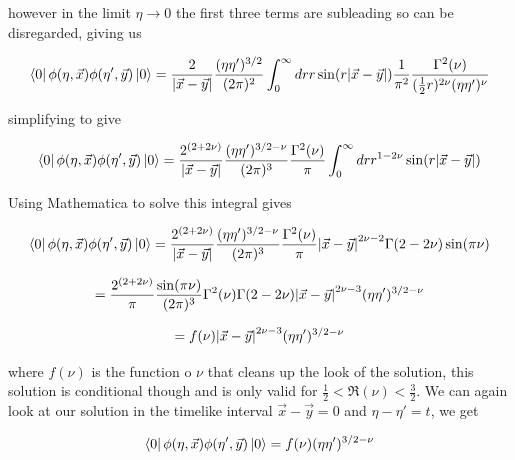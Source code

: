 \documentclass[a4paper,11pt]{article}
\numberwithin{equation}{section}
\numberwithin{figure}{section}
\begin{document}
\begin{large}
however in the limit $\eta\rightarrow0$ the first three terms are subleading so can be disregarded, giving us

\begin{equation}
\label{2pointsolr eta<<1}    
    \bra{0} \phi(\eta,\Vec{x})\phi(\eta',\Vec{y})\ket{0}=\frac{2}{\abs{\Vec{x}-\Vec{y}}}\frac{(\eta\eta')^{3/2}}{(2\pi)^2}\int^\infty_0 dr r \sin(r \abs{\Vec{x}-\Vec{y}}) \frac{1}{\pi^2}\frac{\Gamma^2(\nu)}{(\frac{1}{2}r)^{2\nu}(\eta\eta')^\nu}
\end{equation}

simplifying to give

\begin{equation}
\label{2pointsol eta<<1}    
    \bra{0} \phi(\eta,\Vec{x})\phi(\eta',\Vec{y})\ket{0}=\frac{2^{(2+2\nu)}}{\abs{\Vec{x}-\Vec{y}}}\frac{(\eta\eta')^{3/2-\nu}}{(2\pi)^3}\frac{\Gamma^2(\nu)}{\pi}\int^\infty_0 dr r^{1-2\nu} \sin(r \abs{\Vec{x}-\Vec{y}}) 
\end{equation}


\newpage

Using Mathematica to solve this integral gives 

\begin{equation}
\label{2pointfinalsol eta<<1}    
    \bra{0} \phi(\eta,\Vec{x})\phi(\eta',\Vec{y})\ket{0}=\frac{2^{(2+2\nu)}}{\abs{\Vec{x}-\Vec{y}}}\frac{(\eta\eta')^{3/2-\nu}}{(2\pi)^3}\frac{\Gamma^2(\nu)}{\pi} \abs{\Vec{x}-\Vec{y}}^{2\nu-2}\Gamma(2-2\nu) \sin(\pi\nu)
\end{equation}

\begin{equation}
\label{2pointfinalsol2 eta<<1}    
    =\frac{2^{(2+2\nu)}}{\pi}\frac{\sin(\pi\nu)}{(2\pi)^3}\Gamma^2(\nu) \Gamma(2-2\nu)\abs{\Vec{x}-\Vec{y}}^{2\nu-3} (\eta\eta')^{3/2-\nu}
\end{equation}

\begin{equation}
\label{2pointfinalsol3 eta<<1}    
    =f(\nu)\abs{\Vec{x}-\Vec{y}}^{2\nu-3} (\eta\eta')^{3/2-\nu}
\end{equation}


where $f(\nu)$ is the function o $\nu$ that cleans up the look of the solution, this solution is conditional though and is only valid for $\frac{1}{2}<\Re(\nu)<\frac{3}{2}$. We can again look at our solution in the timelike interval $\Vec{x}-\Vec{y}=0$ and $\eta-\eta'=t$, we get 


\begin{equation}
\label{2point eta<<1 x-y=0}
    \bra{0} \phi(\eta,\Vec{x})\phi(\eta',\Vec{y})\ket{0}=f(\nu) (\eta\eta')^{3/2-\nu}
\end{equation}



\end{large}
\end{document}

